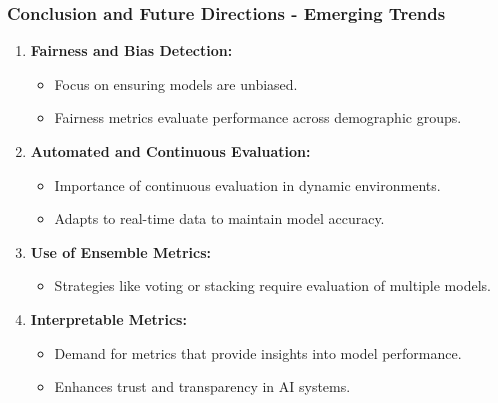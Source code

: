 \documentclass[aspectratio=169]{beamer}
\begin{document}
\begin{frame}[fragile]
    \frametitle{Conclusion and Future Directions - Emerging Trends}
    \begin{enumerate}
        \item \textbf{Fairness and Bias Detection:}
        \begin{itemize}
            \item Focus on ensuring models are unbiased.
            \item Fairness metrics evaluate performance across demographic groups.
        \end{itemize}

        \item \textbf{Automated and Continuous Evaluation:}
        \begin{itemize}
            \item Importance of continuous evaluation in dynamic environments.
            \item Adapts to real-time data to maintain model accuracy.
        \end{itemize}

        \item \textbf{Use of Ensemble Metrics:}
        \begin{itemize}
            \item Strategies like voting or stacking require evaluation of multiple models.
        \end{itemize}

        \item \textbf{Interpretable Metrics:}
        \begin{itemize}
            \item Demand for metrics that provide insights into model performance.
            \item Enhances trust and transparency in AI systems.
        \end{itemize}
    \end{enumerate}
\end{frame}
\end{document}
